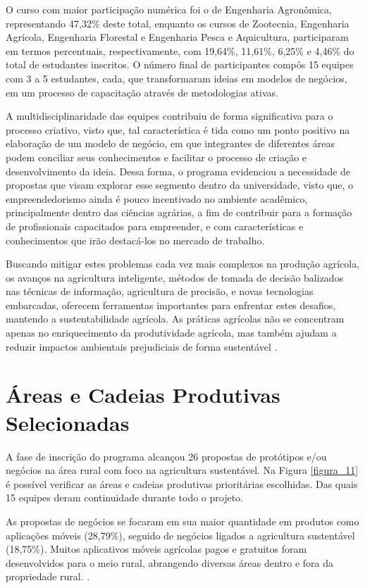 O curso com maior participação numérica foi o de Engenharia Agronômica, representando 47,32\% deste total, enquanto os cursos de Zootecnia, Engenharia Agrícola, Engenharia Florestal e Engenharia Pesca e Aquicultura, participaram em termos percentuais, respectivamente, com 19,64\%, 11,61\%, 6,25\% e 4,46\% do total de estudantes inscritos. O número final de participantes compôs 15 equipes com 3 a 5 estudantes, cada, que transformaram ideias em modelos de negócios, em um processo de capacitação através de metodologias ativas. 

A multidisciplinaridade das equipes contribuiu de forma significativa para o processo criativo, visto que, tal característica é tida como um ponto positivo na elaboração de um modelo de negócio, em que integrantes de diferentes áreas podem conciliar seus conhecimentos e facilitar o processo de criação e desenvolvimento da ideia. Dessa forma, o programa evidenciou a necessidade de propostas que visam explorar esse segmento dentro da universidade, visto que, o empreendedorismo ainda é pouco incentivado no ambiente acadêmico, principalmente dentro das ciências agrárias, a fim de contribuir para a formação de profissionais capacitados para empreender, e com características e conhecimentos que irão destacá-los no mercado de trabalho.

Buscando mitigar estes problemas cada vez mais complexos na produção agrícola, os avanços na agricultura inteligente, métodos de tomada de decisão balizados nas técnicas de informação, agricultura de precisão, e novas tecnologias embarcadas, oferecem ferramentas importantes para enfrentar estes desafios, mantendo a sustentabilidade agrícola. As práticas agrícolas não se concentram apenas no enriquecimento da produtividade agrícola, mas também ajudam a reduzir impactos ambientais prejudiciais de forma sustentável  \cite{adnan_effects_2018,adnan_effects_2018}.

\section{Áreas e Cadeias Produtivas Selecionadas}

A fase de inscrição do programa alcançou 26 propostas de protótipos e/ou negócios na área rural com foco na agricultura sustentável. Na Figura \ref{figura_11} é possível verificar as áreas e cadeias produtivas prioritárias escolhidas. Das quais 15 equipes deram continuidade durante todo o projeto.

As propostas de negócios se focaram em sua maior quantidade em produtos como aplicações móveis (28,79\%), seguido de negócios ligados a agricultura sustentável (18,75\%). Muitos aplicativos móveis agrícolas pagos e gratuitos foram desenvolvidos para o meio rural, abrangendo diversas áreas dentro e fora da propriedade rural. \cite{silva_caracterizacao_2017}. 

